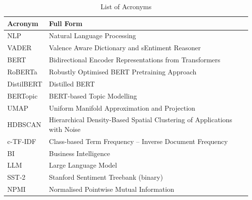 \begin{justify}
\begin{table}[h]
    \centering
    \small
    \caption{List of Acronyms}
    \renewcommand{\arraystretch}{1.4}
    \begin{tabular}{|p{3cm}|p{9cm}|}
        \hline
        \textbf{Acronym} & \textbf{Full Form} \\
        \hline
        NLP   & Natural Language Processing \\
        \hline
        VADER & Valence Aware Dictionary and sEntiment Reasoner \\
        \hline
        BERT  & Bidirectional Encoder Representations from Transformers \\
        \hline
        RoBERTa & Robustly Optimised BERT Pretraining Approach \\
        \hline
        DistilBERT & Distilled BERT \\
        \hline
        BERTopic & BERT-based Topic Modelling \\
        \hline
        UMAP  & Uniform Manifold Approximation and Projection \\
        \hline
        HDBSCAN & Hierarchical Density-Based Spatial Clustering of Applications with Noise \\
        \hline
        c-TF-IDF & Class-based Term Frequency -- Inverse Document Frequency \\
        \hline
        BI    & Business Intelligence \\
        \hline
        LLM   & Large Language Model \\
        \hline
        SST-2 & Stanford Sentiment Treebank (binary) \\
        \hline
        NPMI  & Normalised Pointwise Mutual Information \\
        \hline
    \end{tabular}
    \label{tab:acronyms}
\end{table}

\end{justify}
